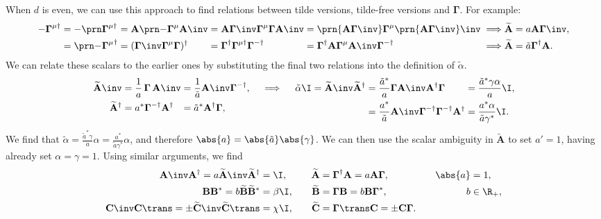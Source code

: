 \documentclass[11pt]{article}
\newcommand{\invd}{^{-\dag}}
\newcommand{\cc}{^\ast}
\newcommand{\hc}{^\dag}
\newcommand{\Gammab}{\boldsymbol{\Gamma}}
\newcommand{\mud}{{\mu\dag}}
\newcommand{\A}{\mathbf{A}}
\newcommand{\B}{\mathbf{B}}
\renewcommand{\C}{\mathbf{C}}
\newcommand{\At}{\widetilde{\A}}
\newcommand{\Bt}{\widetilde{\B}}
\newcommand{\Ct}{\widetilde{\C}}
\newcommand{\alphat}{\tilde{\alpha}}
\begin{document}
When \(d\) is even, we can use this approach to find relations between tilde versions, tilde-free versions and \(\Gammab\).
For example:
%
\begin{equation*}
\begin{alignedat}{6}
  -\Gammab^\mud 
    &= -\Gammap[\mud] &
    &= \A \Gammap*[\mu] \A\inv &
    &= \A \Gammab\inv \Gammab^\mu \Gammab \A\inv &
    &= \prn{\A \Gammab\inv} \Gammab^\mu \prn{\A \Gammab\inv}\inv &
    &\implies &
  \At &= a \A \Gammab\inv, \\
    &= \Gammap*[\mu]\hc &
    &= (\Gammab\inv \Gammab^\mu \Gammab)\hc &
    &= \Gammab\hc \Gammab^\mud \Gammab\invd &
    &= \Gammab\hc \A \Gammab^\mu \A\inv \Gammab\invd &
    &\implies &
  \At &= \tilde{a} \Gammab\hc \A. \\
\end{alignedat}
\end{equation*}
%
We can relate these scalars to the earlier ones by substituting the final two relations into the definition of \(\alphat\).
%
\begin{equation*}
\begin{alignedat}[t]{2}
  \At\inv &= \frac{1}{a} \, \Gammab \, \A\inv &
    &= \frac{1}{\tilde{a}} \A\inv \Gammab\invd, \\
  \At\hc &= a\cc \Gammab\invd \A\hc &
    &= \tilde{a}\cc \A\hc \Gammab,
\end{alignedat}
   \quad\implies\quad
\begin{alignedat}[t]{3}
  \alphat \I &= \At\inv \At\hc &
    &= \frac{\tilde{a}\cc}{a} \Gammab \A\inv \A\hc \Gammab &
      &= \frac{\tilde{a}\cc \gamma \alpha}{a} \I, \\ &&
    &= \frac{a\cc}{\tilde{a}} \A\inv \Gammab\invd \Gammab\invd \A\hc &
      &= \frac{a\cc \alpha}{\tilde{a} \gamma\cc} \I.
\end{alignedat}
\end{equation*}
%
We find that \( \alphat = \frac{\tilde{a}\cc \gamma}{a} \alpha = \frac{a\cc}{\tilde{a} \gamma\cc} \alpha \),
and therefore \( \abs{a} = \abs{\tilde{a}} \abs{\gamma} \).
We can then use the scalar ambiguity in \(\At\) to set \(a' = 1\), having already set \(\alpha = \gamma = 1\).
Using similar arguments, we find
%
\begin{equation}\label{eq:chiraltilde}
\begin{aligned}
  \A\inv \A\hc = a \At\inv \At\hc &=  \I,       &\quad
  \At &= \Gammab\hc \A = a \A \Gammab,            &\quad
  \abs{a} &= 1,                                         \\
  \B \B\cc = b \Bt \Bt\cc &= \beta \I,             &
  \Bt &= \Gammab \B = b \B \Gammab\cc, &
  b &\in \R_+,                                       \\
  \C\inv \C\trans = \pm \Ct\inv \Ct\trans &= \chi \I,    &
  \Ct &= \Gammab\trans \C = \pm \C \Gammab.              &
\end{aligned}
\end{equation}
\end{document}
